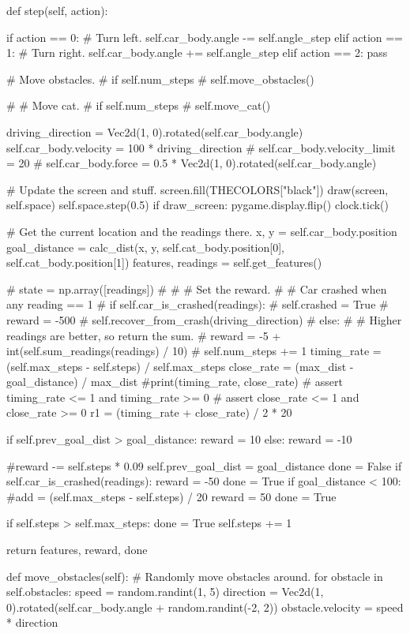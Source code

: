 \begin{python}
def step(self, action):

if action == 0:  # Turn left.
self.car_body.angle -= self.angle_step
elif action == 1:  # Turn right.
self.car_body.angle += self.angle_step
elif action == 2:
pass

# Move obstacles.
# if self.num_steps %
#     self.move_obstacles()

# # Move cat.
# if self.num_steps %
#     self.move_cat()

driving_direction = Vec2d(1, 0).rotated(self.car_body.angle)
self.car_body.velocity = 100 * driving_direction
# self.car_body.velocity_limit = 20
# self.car_body.force = 0.5 * Vec2d(1, 0).rotated(self.car_body.angle)

# Update the screen and stuff.
screen.fill(THECOLORS["black"])
draw(screen, self.space)
self.space.step(0.5)
if draw_screen:
pygame.display.flip()
clock.tick()

# Get the current location and the readings there.
x, y = self.car_body.position
goal_distance = calc_dist(x, y, self.cat_body.position[0], self.cat_body.position[1])
features, readings = self.get_features()

# state = np.array([readings])
#
# # Set the reward.
# # Car crashed when any reading == 1
# if self.car_is_crashed(readings):
#     self.crashed = True
#     reward = -500
#     self.recover_from_crash(driving_direction)
# else:
#     # Higher readings are better, so return the sum.
#     reward = -5 + int(self.sum_readings(readings) / 10)
# self.num_steps += 1
timing_rate = (self.max_steps - self.steps) / self.max_steps
close_rate = (max_dist - goal_distance) / max_dist
#print(timing_rate, close_rate)
# assert timing_rate <= 1 and timing_rate >= 0
# assert close_rate <= 1 and close_rate >= 0
r1 = (timing_rate + close_rate) / 2 * 20

if self.prev_goal_dist > goal_distance:
reward = 10
else:
reward = -10


#reward -= self.steps * 0.09
self.prev_goal_dist = goal_distance
done = False
if self.car_is_crashed(readings):
reward = -50
done = True
if goal_distance < 100:
#add = (self.max_steps - self.steps) / 20
reward = 50
done = True

if self.steps > self.max_steps:
done = True
self.steps += 1

return features, reward, done

def move_obstacles(self):
# Randomly move obstacles around.
for obstacle in self.obstacles:
speed = random.randint(1, 5)
direction = Vec2d(1, 0).rotated(self.car_body.angle + random.randint(-2, 2))
obstacle.velocity = speed * direction


\end{python}
